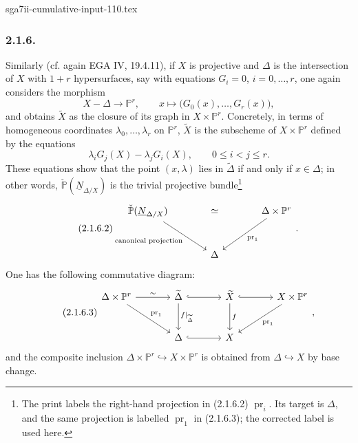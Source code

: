 \begin{filecontents*}{sga7ii-cumulative-input-110.tex}
\subsubsection*{2.1.6.}
Similarly (cf. again EGA IV, 19.4.11), if $X$ is projective and $\Delta$ is
the intersection of $X$ with $1+r$ hypersurfaces, say with equations
$G_i=0$, $i=0,\ldots,r$, one again considers the morphism
\[
X-\Delta\longrightarrow\mathbb P^r,\qquad
x\longmapsto\bigl(G_0(x),\ldots,G_r(x)\bigr),
\]
and obtains $\widetilde X$ as the closure of its graph in
$X\times\mathbb P^r$. Concretely, in terms of homogeneous coordinates
$\lambda_0,\ldots,\lambda_r$ on $\mathbb P^r$, $\widetilde X$ is the
subscheme of $X\times\mathbb P^r$ defined by the equations
\begin{equation}\tag{2.1.6.1}
\lambda_iG_j(X)-\lambda_jG_i(X),
\qquad 0\leq i<j\leq r.
\end{equation}
These equations show that the point $(x,\lambda)$ lies in
$\widetilde\Delta$ if and only if $x\in\Delta$; in other words,
$\check{\mathbb P}(\underline N_{\Delta/X})$ is the trivial projective
bundle\footnote{The print labels the right-hand projection in (2.1.6.2)
$\operatorname{pr}_i$. Its target is $\Delta$, and the same projection is
labelled $\operatorname{pr}_1$ in (2.1.6.3); the corrected label is used
here.}
\begin{equation}\tag{2.1.6.2}
\begin{tikzcd}[column sep=large,row sep=large]
\check{\mathbb P}(\underline N_{\Delta/X})
  \arrow[rr,phantom,"\simeq"]
  \arrow[dr,"\text{canonical projection}"']
  & {} &
\Delta\times\mathbb P^r
  \arrow[dl,"\operatorname{pr}_1"]\\
{} & \Delta & {}
\end{tikzcd}.
\end{equation}
One has the following commutative diagram:
\begin{equation}\tag{2.1.6.3}
\begin{tikzcd}[column sep=large,row sep=large]
\Delta\times\mathbb P^r
  \arrow[r,"\sim"]
  \arrow[dr,"\operatorname{pr}_1"]
&
\widetilde\Delta
  \arrow[r,hook]
  \arrow[d,"f|_{\widetilde\Delta}"]
&
\widetilde X
  \arrow[r,hook]
  \arrow[d,"f"]
&
X\times\mathbb P^r
  \arrow[dl,"\operatorname{pr}_1"]
\\
{} & \Delta \arrow[r,hook] & X & {}
\end{tikzcd},
\end{equation}
and the composite inclusion
$\Delta\times\mathbb P^r\hookrightarrow X\times\mathbb P^r$ is obtained
from $\Delta\hookrightarrow X$ by base change.
\end{filecontents*}
